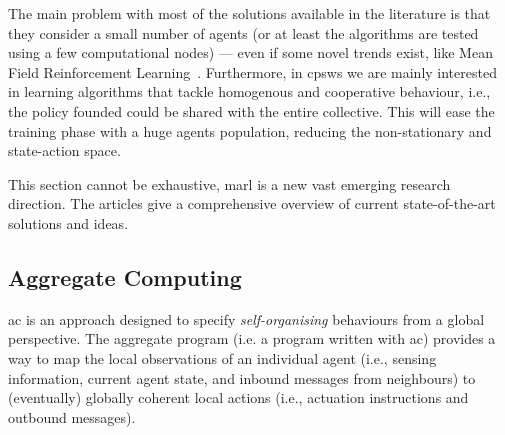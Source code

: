 \documentclass[11pt]{article}
\begin{document}
%
 
The main problem with most of the solutions available in the literature is that they consider a small number of agents (or at least the algorithms are tested using a few computational nodes) --- even if some novel trends exist, like Mean Field Reinforcement Learning~\cite{DBLP:journals/corr/abs-2108-02731}.
%
Furthermore, in \acp{cpsw} we are mainly interested in learning algorithms that tackle homogenous and cooperative behaviour, i.e., the policy founded could be shared with the entire collective. 
%
This will ease the training phase with a huge agents population, reducing the non-stationary and state-action space.

This section cannot be exhaustive, \ac{marl} is a new vast emerging research direction. 
%
The articles \cite{DBLP:journals/aamas/Hernandez-LealK19, DBLP:journals/corr/abs-1911-10635, DBLP:journals/corr/abs-1908-03963} give a comprehensive overview of current state-of-the-art solutions and ideas.
\subsection{Aggregate Computing}

\ac{ac} is an approach designed to specify \emph{self-organising} behaviours from a global perspective.
%
The aggregate program (i.e. a program written with \ac{ac}) provides a way to map the local observations of an individual agent (i.e., sensing information, current agent state, and inbound messages from neighbours) to (eventually) globally coherent local actions
 (i.e., actuation instructions and outbound messages).
%
\end{document}
